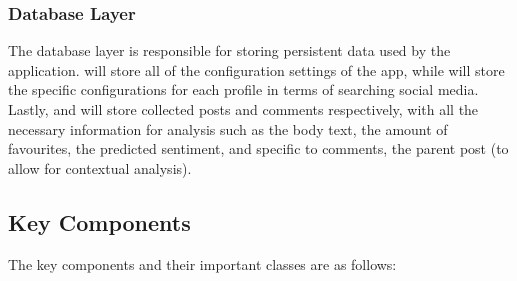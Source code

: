         \subsubsection{Database Layer}
        The database layer is responsible for storing persistent data used by the application.  will store all of the configuration settings of the app, while  will store the specific configurations for each profile in terms of searching social media. Lastly,  and  will store collected posts and comments respectively, with all the necessary information for analysis such as the body text, the amount of favourites, the predicted sentiment, and specific to comments, the parent post (to allow for contextual analysis).

    \subsection{Key Components}
    The key components and their important classes are as follows:
